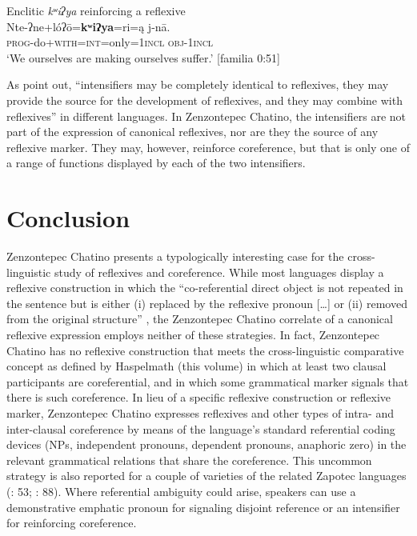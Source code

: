 \documentclass[output=paper]{../langscibook}
\begin{document}
\ea\label{ex:campbell:52}
{Enclitic \textit{kʷiʔya} reinforcing a reflexive}\\
\gll Nte-ʔne+lóʔō=\textbf{kʷiʔya}=ri=ą  j-nā.\\
     \textsc{prog-}do+\textsc{with=int}=only=\textsc{1incl}  \textsc{obj}{}-\textsc{1incl}\\
\glt ‘We ourselves are making ourselves suffer.’ [familia 0:51]
\z


As \citet[68]{KoenigSiemund1999} point out, “intensifiers may be completely identical to reflexives, they may provide the source for the development of reflexives, and they may combine with reflexives” in different languages. In Zenzontepec Chatino, the intensifiers are not part of the expression of canonical reflexives, nor are they the source of any reflexive marker. They may, however, reinforce coreference, but that is only one of a range of functions displayed by each of the two intensifiers.


\section{Conclusion}
\label{sec:campbell:6}

Zenzontepec Chatino presents a typologically interesting case for the cross-linguistic study of reflexives and coreference. While most languages display a reflexive construction in which the “co-referential direct object is not repeated in the sentence but is either (i) replaced by the reflexive pronoun […] or (ii) removed from the original structure” \citep[268]{Kulikov2013}, the Zenzontepec Chatino correlate of a canonical reflexive expression employs neither of these strategies. In fact, Zenzontepec Chatino has no reflexive construction that meets the cross-linguistic comparative concept as defined by Haspelmath (this volume) in which at least two clausal participants are coreferential, and in which some grammatical marker signals that there is such coreference. In lieu of a specific reflexive construction or reflexive marker, Zenzontepec Chatino expresses reflexives and other types of intra- and inter-clausal coreference by means of the language’s standard referential coding devices (NPs, independent pronouns, dependent pronouns, anaphoric zero) in the relevant grammatical relations that share the coreference. This uncommon strategy is also reported for a couple of varieties of the related Zapotec languages (\citealt{AntonioRamos2015}: 53; \citealt{Lee2003}: 88). Where referential ambiguity could arise, speakers can use a demonstrative emphatic pronoun for signaling disjoint reference or an intensifier for reinforcing coreference.
\end{document}
